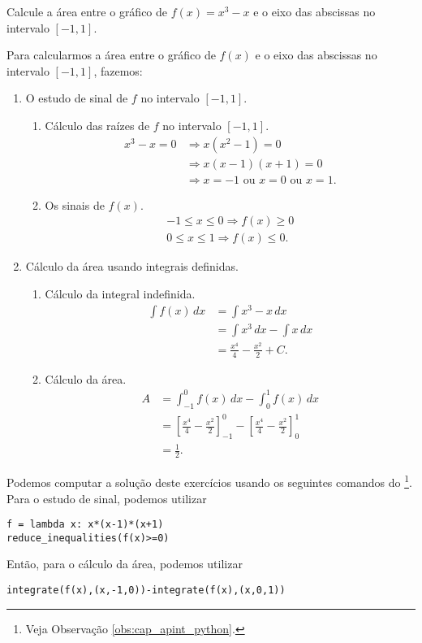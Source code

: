 \begin{exeresol}
  Calcule a área entre o gráfico de $f(x) = x^3-x$ e o eixo das abscissas no intervalo $[-1,1]$.
\end{exeresol}
\begin{resol}
  Para calcularmos a área entre o gráfico de $f(x)$ e o eixo das abscissas no intervalo $[-1,1]$, fazemos:
  \begin{enumerate}[1.]
  \item O estudo de sinal de $f$ no intervalo $[-1,1]$.
    \begin{enumerate}
    \item Cálculo das raízes de $f$ no intervalo $[-1,1]$.
      \begin{align}
        x^3-x=0 &\Rightarrow x(x^2-1)=0\\
                &\Rightarrow x(x-1)(x+1)=0\\
                &\Rightarrow x=-1\text{ ou }x=0\text{ ou }x=1.
      \end{align}
    \item Os sinais de $f(x)$.
      \begin{align}
        -1\leq x \leq 0 \Rightarrow f(x)\geq 0\\
        0\leq x \leq 1 \Rightarrow f(x)\leq 0.
      \end{align}
    \end{enumerate}
  \item Cálculo da área usando integrais definidas.
    \begin{enumerate}
    \item Cálculo da integral indefinida.
      \begin{align}
        \int f(x)\,dx &= \int x^3-x\,dx\\
                      &= \int x^3\,dx - \int x\,dx\\
                      &= \frac{x^4}{4} - \frac{x^2}{2} + C.
      \end{align}
    \item Cálculo da área.
    \begin{align}
      A &= \int_{-1}^0 f(x)\,dx - \int_{0}^{1} f(x)\,dx \\
        &= \left[\frac{x^4}{4} - \frac{x^2}{2}\right]_{-1}^0 - \left[\frac{x^4}{4} - \frac{x^2}{2}\right]_{0}^1\\
        &= \frac{1}{2}.
    \end{align}
    \end{enumerate}
  \end{enumerate}

  \ifispython
  Podemos computar a solução deste exercícios usando os seguintes comandos do \sympy\footnote{Veja Observação \ref{obs:cap_apint_python}.}. Para o estudo de sinal, podemos utilizar
\begin{verbatim}
f = lambda x: x*(x-1)*(x+1)
reduce_inequalities(f(x)>=0)
\end{verbatim}
  Então, para o cálculo da área, podemos utilizar
\begin{verbatim}
integrate(f(x),(x,-1,0))-integrate(f(x),(x,0,1))
\end{verbatim}
  \fi
\end{resol}

